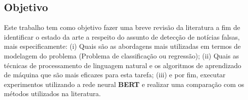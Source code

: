\subsection{Objetivo}


Este trabalho tem como objetivo fazer uma breve revisão da literatura a fim de identificar o estado da arte a respeito do assunto de detecção de notícias falsas, mais especificamente: (i) Quais são as abordagens mais utilizadas em termos de modelagem do problema (Problema de classificação ou regressão); (ii) Quais as técnicas de processamento de linguagem natural e os algoritmos de aprendizado de máquina que são mais eficazes para esta tarefa; (iii) e por fim, executar experimentos utilizando a rede neural \textbf{BERT} e realizar uma comparação com os métodos utilizados na literatura.



